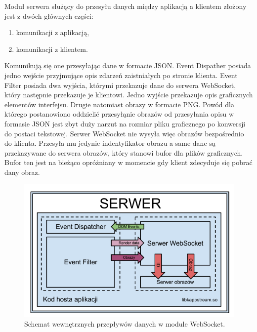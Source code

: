 Moduł serwera służący do przesyłu danych między aplikacją a klientem złożony jest z dwóch głównych części:
\begin{enumerate}
\item komunikacji z aplikacją,
\item komunikacji z klientem.
\end{enumerate}
Komunikują się one przesyłając dane w formacie JSON. Event Dispather posiada jedno wejście przyjmujące opis zdarzeń zaistniałych po stronie klienta. Event Filter posiada dwa wyjścia, którymi przekazuje dane do serwera WebSocket, który następnie przekazuje je klientowi. Jedno wyjście przekazuje opis graficznych elementów interfejsu. Drugie natomiast obrazy w formacie PNG. Powód dla którego postanowiono oddzielić przesyłąnie obrazów od przesyłania opisu w formasie JSON jest zbyt duży narzut na rozmiar pliku graficznego po konwersji do postaci tekstowej. Serwer WebSocket nie wysyła więc obrazów bezpośrednio do klienta. Przesyła mu jedynie indentyfikator obrazu a same dane są przekazywane do serwera obrazów, który stanowi bufor dla plików graficznych. Bufor ten jest na bieżąco opróżniany w momencie gdy klient zdecyduje się pobrać dany obraz.

\begin{figure}[H]
\centering
\includegraphics[width=0.8\linewidth]{img/arch-lib}
\caption{Schemat wewnętrznych przepływów danych w module WebSocket.}
\label{fig:arch-lib}
\end{figure}
